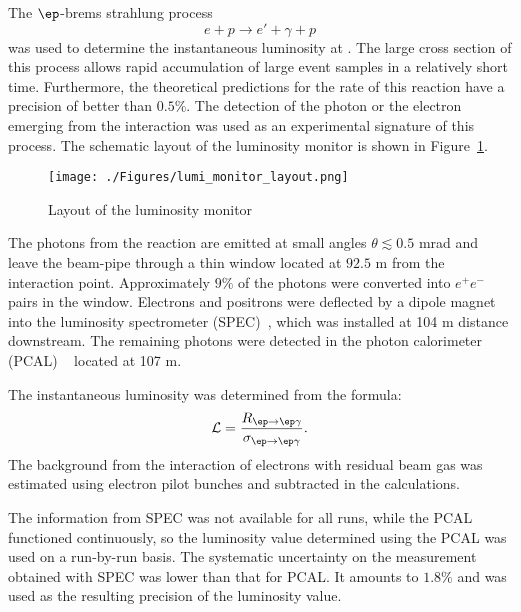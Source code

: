 The $\ep$-brems strahlung process~\cite{Bethe:1934za}
\begin{equation}
	e + p \rightarrow e' + \gamma + p
\end{equation}
was used to determine the instantaneous luminosity at \zeus. The large cross section of this process allows rapid accumulation of large event samples in a relatively short time. Furthermore, the theoretical predictions for the rate of this reaction have a precision of better than $0.5\%$. The detection of the photon or the electron emerging from the interaction was used as an experimental signature of this process. The schematic layout of the luminosity monitor is shown in Figure~\ref{fig:lumi_monitor_layout}.
\begin{figure}
	\centering
		\texttt{[image: ./Figures/lumi\_monitor\_layout.png]}
	\caption{Layout of the \zeus luminosity monitor}
	\label{fig:lumi_monitor_layout}
\end{figure}
The photons from the reaction are emitted at small angles $\theta \lesssim 0.5$ mrad and leave the beam-pipe through a thin window located at $92.5$ m from the interaction point. Approximately $9\%$ of the photons were converted into $e^+e^-$ pairs in the window. Electrons and positrons were deflected by a dipole magnet into the luminosity spectrometer (SPEC)~\cite{physics-0512153}, which was installed at 104 m distance downstream. The remaining photons were detected in the photon calorimeter (PCAL) ~\cite{desy-92-066,zfp:c63:391,acpp:b32:2025} located at 107 m.

The instantaneous luminosity was determined from the formula:
\begin{equation}
\mathcal{L} = \frac{R_{\ep\rightarrow \ep\gamma}}{ \sigma_{\ep\rightarrow \ep\gamma}}.
\end{equation}
The background from the interaction of electrons with residual beam gas was estimated using electron pilot bunches and subtracted in the calculations.

The information from SPEC was not available for all runs, while the PCAL functioned continuously, so the luminosity value determined using the PCAL was used on a run-by-run basis. The systematic uncertainty on the measurement obtained with SPEC was lower than that for PCAL. It amounts to $1.8\%$ and was used as the resulting precision of the luminosity value.

